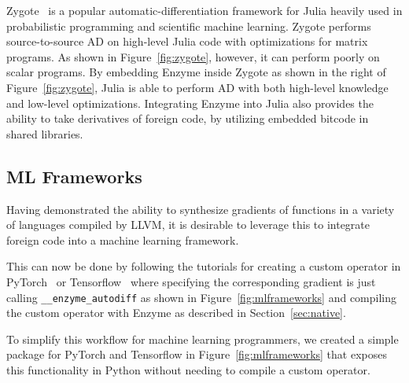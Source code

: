 Zygote~\cite{zygoteArxiv, zygoteDP, zygoteMlsys} is a popular automatic-differentiation framework for Julia heavily used in probabilistic programming and scientific machine learning. Zygote performs source-to-source AD on high-level Julia code with optimizations for matrix programs. As shown in Figure~\ref{fig:zygote}, however, it can perform poorly on scalar programs. By embedding Enzyme inside Zygote as shown in the right of Figure~\ref{fig:zygote}, Julia is able to perform AD with both high-level knowledge and low-level optimizations. Integrating Enzyme into Julia also provides the ability to take derivatives of foreign code, by utilizing embedded bitcode in shared libraries.

\subsection{ML Frameworks}
Having demonstrated the ability to synthesize gradients of functions in a variety of languages compiled by LLVM, it is desirable to leverage this to integrate foreign code into a machine learning framework.

This can now be done by following the tutorials for creating a custom operator in PyTorch~\cite{pytorchcustom} or Tensorflow~\cite{tfcustom} where specifying the corresponding gradient is just calling \texttt{\_\_enzyme\_autodiff} as shown in Figure~\ref{fig:mlframeworks} and compiling the custom operator with Enzyme as described in Section~\ref{sec:native}.

To simplify this workflow for machine learning programmers, we created a simple package for PyTorch and Tensorflow in Figure~\ref{fig:mlframeworks} that exposes this functionality in Python without needing to compile a custom operator.


